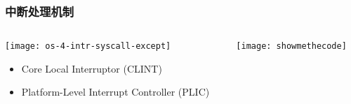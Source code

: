 \begin{frame}[plain,t]
	\frametitle{中断处理机制}
	\begin{columns}
		
		\begin{column}{0.4\textwidth}
			\centering
			\texttt{[image: os-4-intr-syscall-except]}
			\begin{itemize} \small
				\item Core Local	Interruptor (CLINT)
				\item Platform-Level Interrupt Controller (PLIC)
			\end{itemize}
			
		\end{column}
		
		\begin{column}{0.6\textwidth}
			
			\centering
			
			\texttt{[image: showmethecode]}
		
		\end{column}
		
	\end{columns}
	
\end{frame}
